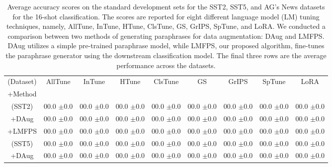 \documentclass[11pt]{article}
\begin{document}
\begin{table*}
\centering
\caption{Average accuracy scores on the standard development sets for the SST2, SST5, and AG's News datasets for the 16-shot classification. The scores are reported for eight different language model (LM) tuning techniques, namely, AllTune, InTune, HTune, ClsTune, GS, GrIPS, SpTune, and LoRA. We conducted a comparison between two methods of generating paraphrases for data augmentation: DAug and LMFPS. DAug utilizes a simple pre-trained paraphrase model, while LMFPS, our proposed algorithm, fine-tunes the paraphrase generator using the downstream classification model. The final three rows are the average performance across the datasets.}
\begin{tabular}{c | c | c | c | c | c | c | c | c}
\hline
(Dataset) & AllTune & InTune & HTune & ClsTune & GS & GrIPS & SpTune & LoRA \\
\small+Method &  &  &  &  &  &  &  &  \\
\hline
(SST2) & \small00.0 \small$\pm$\small0.0 & \small00.0 \small$\pm$\small0.0 & \small00.0 \small$\pm$\small0.0 & \small00.0 \small$\pm$\small0.0 & \small00.0 \small$\pm$\small0.0 & \small00.0 \small$\pm$\small0.0 & \small00.0 \small$\pm$\small0.0 & \small00.0 \small$\pm$\small0.0\\
\small+DAug & \small00.0 \small$\pm$\small0.0 & \small00.0 \small$\pm$\small0.0 & \small00.0 \small$\pm$\small0.0 & \small00.0 \small$\pm$\small0.0 & \small00.0 \small$\pm$\small0.0 & \small00.0 \small$\pm$\small0.0 & \small00.0 \small$\pm$\small0.0 & \small00.0 \small$\pm$\small0.0\\
\small+LMFPS & \small00.0 \small$\pm$\small0.0 & \small00.0 \small$\pm$\small0.0 & \small00.0 \small$\pm$\small0.0 & \small00.0 \small$\pm$\small0.0 & \small00.0 \small$\pm$\small0.0 & \small00.0 \small$\pm$\small0.0 & \small00.0 \small$\pm$\small0.0 & \small00.0 \small$\pm$\small0.0\\
\hline
(SST5) & \small00.0 \small$\pm$\small0.0 & \small00.0 \small$\pm$\small0.0 & \small00.0 \small$\pm$\small0.0 & \small00.0 \small$\pm$\small0.0 & \small00.0 \small$\pm$\small0.0 & \small00.0 \small$\pm$\small0.0 & \small00.0 \small$\pm$\small0.0 & \small00.0 \small$\pm$\small0.0\\
\small+DAug & \small00.0 \small$\pm$\small0.0 & \small00.0 \small$\pm$\small0.0 & \small00.0 \small$\pm$\small0.0 & \small00.0 \small$\pm$\small0.0 & \small00.0 \small$\pm$\small0.0 & \small00.0 \small$\pm$\small0.0 & \small00.0 \small$\pm$\small0.0 & \small00.0 \small$\pm$\small0.0\\

\end{tabular}
\end{table*}
\end{document}
